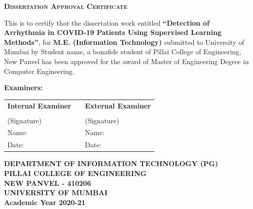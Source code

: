 \thispagestyle{empty}

{\centering
    {\LARGE\bf
        \scshape{Dissertation Approval Certificate}
    }\\
}
\begin{spacing}{1.5}
\vspace{.5cm}
{\centering
    {
        This is to certify that the dissertation work entitled \textbf{``Detection of
        Arrhythmia in COVID-19 Patients Using Supervised Learning Methods''}, for \textbf{M.E.
        (Information Technology)} submitted to University of Mumbai by Student name, a bonafide
        student of Pillai College of Engineering, New Panvel has been approved for the award of
        Master of Engineering Degree in Computer Engineering.
    }
}

\vspace{1.75cm}
\noindent
{\Large\bf
    {Examiners:}
}

\begin{table}[H]
    \centering
    \begin{tabularx}{\textwidth}{@{}L{13em}L{9em}L{13em}@{}}
        {\large\bf Internal Examiner} &  & {\large\bf External Examiner} \\
         & & \\
        (Signature) & & (Signature) \\
        Name: & & Name: \\
        Date: & & Date: \\
    \end{tabularx}
\end{table}
\end{spacing}

\vspace{2.5cm}
{\centering\large
    \begin{figure}[h!]
        {\par}
    \end{figure}
    \vspace{0.2cm}

    {\bf
        DEPARTMENT OF INFORMATION TECHNOLOGY (PG)\\
        \vspace{0.2cm}
        \bf {PILLAI COLLEGE OF ENGINEERING}\\
        \bf NEW PANVEL - 410206
    } \\
    {
        \hspace{.5cm}
        {\bf UNIVERSITY OF MUMBAI} \\
        \vspace{0.2cm}
        {\bf Academic Year 2020-21}\\
    }
}